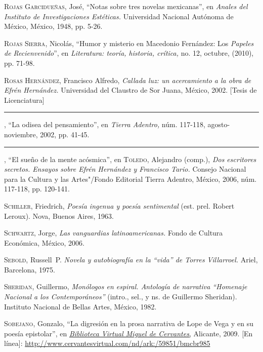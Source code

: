 \documentclass[14pt,twoside,final]{extbook} %
\begin{document}
\textsc{Rojas Garcidueñas}, José, ``Notas sobre tres novelas mexicanas'', en \emph{Anales del Instituto de Investigaciones Estéticas.} Universidad Nacional Autónoma de México, México, 1948, pp. 5-26.\label{bib:rojas1948}

\textsc{Rojas Sierra}, Nicolás, ``Humor y misterio en Macedonio Fernández: Los \emph{Papeles de Recienvenido}'', en \emph{Literatura: teoría, historia, crítica,} no. 12, octubre, (2010), pp. 71-98.\label{bib:rojas2010}

\textsc{Rosas Hernández}, Francisco Alfredo, \emph{Callada luz: un acercamiento a la obra de Efrén Hernández.} Universidad del Claustro de Sor Juana, México, 2002. [Tesis de Licenciatura]\label{bib:rosas2002a}

\rule{1cm}{0.4pt}, ``La odisea del pensamiento'', en \emph{Tierra Adentro,} núm. 117-118, agosto-noviembre, 2002, pp. 41-45.\label{bib:rosas2002b}

\rule{1cm}{0.4pt}, ``El sueño de la mente acósmica'', en \textsc{Toledo}, Alejandro (comp.), \emph{Dos escritores secretos. Ensayos sobre Efrén Hernández y Francisco Tario.} Consejo Nacional para la Cultura y las Artes"/Fondo Editorial Tierra Adentro, México, 2006, núm. 117-118, pp. 120-141.\label{bib:rosas2006}

\textsc{Schiller}, Friedrich, \emph{Poesía ingenua y poesía sentimental} (est. prel. Robert Leroux). Nova, Buenos Aires, 1963.\label{bib:schiller1963}

\textsc{Schwartz}, Jorge, \emph{Las vanguardias latinoamericanas.} Fondo de Cultura Económica, México, 2006.\label{bib:schwartz2006}

\textsc{Sebold}, Russell~P. \emph{Novela y autobiografía en la ``vida'' de Torres Villarroel.} Ariel, Barcelona, 1975.\label{bib:sebold1975}

\textsc{Sheridan}, Guillermo, \emph{Monólogos en espiral. Antología de narrativa ``Homenaje Nacional a los \emph{Contemporáneos}''} (intro., sel., y ns. de Guillermo Sheridan). Instituto Nacional de Bellas Artes, México, 1982.\label{bib:sheridan1982}

\textsc{Sobejano}, Gonzalo, ``La digresión en la prosa narrativa de Lope de Vega y en su poesía epistolar'', en \href{http://www.cervantesvirtual.com/}{\emph{Biblioteca Virtual Miguel de Cervantes},} Alicante, 2009. [En línea]: \url{http://www.cervantesvirtual.com/nd/ark:/59851/bmcbr985}\label{bib:sobejano2009}
\end{document}
